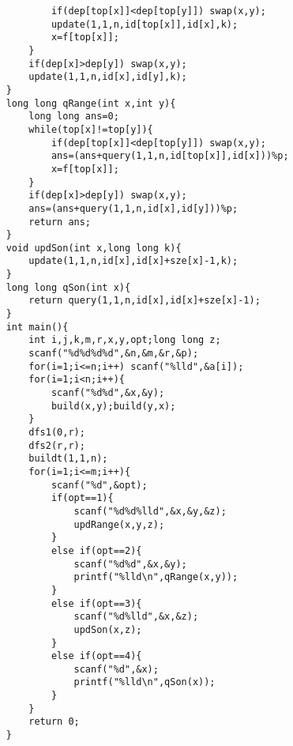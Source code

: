 \begin{lstlisting}
            if(dep[top[x]]<dep[top[y]]) swap(x,y);
            update(1,1,n,id[top[x]],id[x],k);
            x=f[top[x]];
        }
        if(dep[x]>dep[y]) swap(x,y);
        update(1,1,n,id[x],id[y],k);
    }
    long long qRange(int x,int y){
        long long ans=0;
        while(top[x]!=top[y]){
            if(dep[top[x]]<dep[top[y]]) swap(x,y);
            ans=(ans+query(1,1,n,id[top[x]],id[x]))%p;
            x=f[top[x]];
        }
        if(dep[x]>dep[y]) swap(x,y);
        ans=(ans+query(1,1,n,id[x],id[y]))%p;
        return ans;
    }
    void updSon(int x,long long k){
        update(1,1,n,id[x],id[x]+sze[x]-1,k);
    }
    long long qSon(int x){
        return query(1,1,n,id[x],id[x]+sze[x]-1);
    }
    int main(){
        int i,j,k,m,r,x,y,opt;long long z;
        scanf("%d%d%d%d",&n,&m,&r,&p);
        for(i=1;i<=n;i++) scanf("%lld",&a[i]);
        for(i=1;i<n;i++){
            scanf("%d%d",&x,&y);
            build(x,y);build(y,x);
        }
        dfs1(0,r);
        dfs2(r,r);
        buildt(1,1,n);
        for(i=1;i<=m;i++){
            scanf("%d",&opt);
            if(opt==1){
                scanf("%d%d%lld",&x,&y,&z);
                updRange(x,y,z);
            }
            else if(opt==2){
                scanf("%d%d",&x,&y);
                printf("%lld\n",qRange(x,y));
            }
            else if(opt==3){
                scanf("%d%lld",&x,&z);
                updSon(x,z);
            }
            else if(opt==4){
                scanf("%d",&x);
                printf("%lld\n",qSon(x));
            }
        }
        return 0;
    }
\end{lstlisting}

